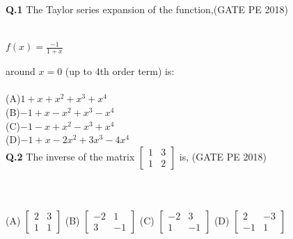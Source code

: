 \documentclass[12pt,a4paper]{article}
\renewcommand{\headrulewidth}{0.4pt}
\begin{document}
\clearpage
{}
\fancyfoot[R]{\thepage}

\renewcommand{\headrulewidth}{0.4pt}

\fancyfoot[R]{\thepage/\pageref{LastPage}}


\\\\
\noindent
\textbf{Q.1}\hspace{0.5em}  The Taylor series expansion of the function,\hfill(GATE PE 2018)\\\\

\begin{center}
	{\Large $f(x)=\frac{-1}{1+x}$}
\end{center}
\noindent
around $x = 0$ (up to 4th order term) is:\\\\
(A)$ 1 + x + x^2 + x^3 + x^4$\\
(B)$ -1 + x - x^2 + x^3 - x^4$\\
(C)$ -1 - x + x^2 - x^3 + x^4$\\
(D)$ -1 + x - 2x^2 + 3x^3 - 4x^4$\\

\noindent
	\textbf{Q.2} \hspace{0.5em} The inverse of the matrix $\begin{bmatrix} 1 & 3 \\ 1 & 2 \end{bmatrix}$ is, \hfill(GATE PE 2018) \\\\\\\\
\hspace*{2em} (A) $\begin{bmatrix} 2 & 3 \\ 1 & 1 \end{bmatrix}$ \hspace{2em}
(B) $\begin{bmatrix} -2 & 1 \\ 3 & -1 \end{bmatrix}$ \hspace{2em}
(C) $\begin{bmatrix} -2 & 3 \\ 1 & -1 \end{bmatrix}$ \hspace{2em}
(D) $\begin{bmatrix} 2 & -3 \\ -1 & 1 \end{bmatrix}$\\\\
\end{document}
